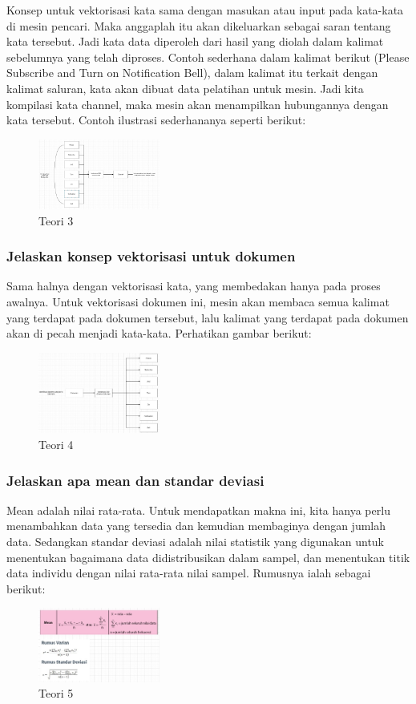 \hfill\break
Konsep untuk vektorisasi kata sama dengan masukan atau input pada kata-kata di mesin pencari. Maka anggaplah itu akan dikeluarkan sebagai saran tentang kata tersebut. Jadi kata data diperoleh dari hasil yang diolah dalam kalimat sebelumnya yang telah diproses. Contoh sederhana dalam kalimat berikut (Please Subscribe and Turn on Notification Bell), dalam kalimat itu terkait dengan kalimat saluran, kata akan dibuat data pelatihan untuk mesin. Jadi kita kompilasi kata channel, maka mesin akan menampilkan hubungannya dengan kata tersebut. Contoh ilustrasi sederhananya seperti berikut:
\begin{figure}[H]
\includegraphics[width=4cm]{figures/1174067/5/3.jpg}
\centering
\caption{Teori 3}
\end{figure}

\subsubsection{Jelaskan konsep vektorisasi untuk dokumen}	
\hfill\break
Sama halnya dengan vektorisasi kata, yang membedakan hanya pada proses awalnya. Untuk vektorisasi dokumen ini, mesin akan membaca semua kalimat yang terdapat pada dokumen tersebut, lalu kalimat yang terdapat pada dokumen akan di pecah menjadi kata-kata. Perhatikan gambar berikut: 
\begin{figure}[H]
\includegraphics[width=4cm]{figures/1174067/5/4.jpg}
\centering
\caption{Teori 4}
\end{figure}

\subsubsection{Jelaskan apa mean dan standar deviasi}
\hfill\break
Mean adalah nilai rata-rata. Untuk mendapatkan makna ini, kita hanya perlu menambahkan data yang tersedia dan kemudian membaginya dengan jumlah data. Sedangkan standar deviasi adalah nilai statistik yang digunakan untuk menentukan bagaimana data didistribusikan dalam sampel, dan menentukan titik data individu dengan nilai rata-rata nilai sampel. Rumusnya ialah sebagai berikut:
\begin{figure}[H]
\includegraphics[width=4cm]{figures/1174067/5/5.jpg}
\centering
\caption{Teori 5}
\end{figure}

